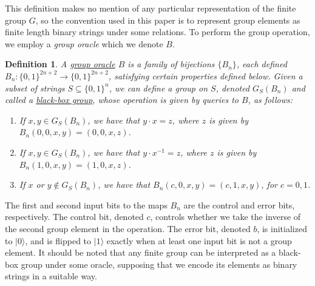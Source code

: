 \documentclass[12pt]{article}
\newtheorem{defn}{Definition}
\numberwithin{thm}{section}
\numberwithin{defn}{section}
\numberwithin{prop}{section}
\numberwithin{rmk}{section}
\newcommand{\ket}[1]{\vert #1 \rangle}
\begin{document}
	This definition makes no mention of any particular representation of the finite group $G$, so the convention used in this paper is to represent group elements as finite length binary strings under some relations. To perform the group operation, we employ a \textit{group oracle} which we denote $B$. 
	\begin{defn}
		A \underline{group oracle} $B$ is a family of bijections $\{B_n\}$, each defined $B_n\colon \{0,1\}^{2n+2}\to  \{0,1\}^{2n+2}$, satisfying certain properties defined below. Given a subset of strings $S\subseteq \{0,1\}^n$, we can define a group on $S$, denoted $G_S(B_n)$ and called a \underline{\textit{black-box group}}, whose operation is given by queries to $B$, as follows:
		\begin{enumerate}
			\item If $x,y\in G_S(B_n)$, we have that $y\cdot x=z$, where $z$ is given by $B_n(0,0,x,y)=(0,0,x,z)$.
			\item If $x,y\in G_S(B_n)$, we have that $y\cdot x^{-1}=z$, where $z$ is given by $B_n(1,0,x,y)=(1,0,x,z)$.
			\item If $x$ or $y\notin G_S(B_n)$, we have that $B_n(c,0,x,y)=(c,1,x,y)$, for $c=0,1$.
		\end{enumerate}
	\end{defn}
	The first and second input bits to the maps $B_n$ are the control and error bits, respectively. The control bit, denoted $c$, controls whether we take the inverse of the second group element in the operation. The error bit, denoted $b$, is initialized to $\ket{0}$, and is flipped to $\ket{1}$ exactly when at least one input bit is not a group element. It should be noted that any finite group can be interpreted as a black-box group under some oracle, supposing that we encode its elements as binary strings in a suitable way.\\
	
\end{document}
